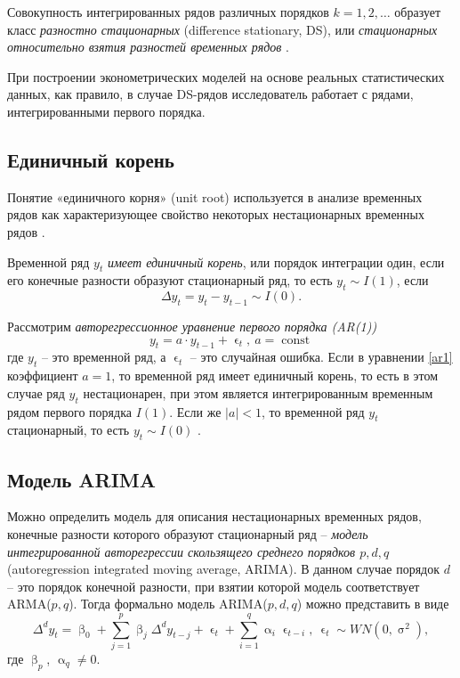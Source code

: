 \documentclass[a4paper, 14pt]{extreport}
\numberwithin{equation}{section}
\renewcommand{\alpha}{\upalpha}
\renewcommand{\beta}{\upbeta}
\renewcommand{\epsilon}{\upvarepsilon}
\renewcommand{\sigma}{\upsigma}
\newcommand{\const}{\operatorname{const}}
\numberwithin{equation}{section}
\begin{document}
	Совокупность интегрированных рядов различных порядков
	$k=1,2,\ldots$  образует класс \textit{разностно стационарных} (difference stationary, DS), или \textit{стационарных относительно взятия  разностей временных рядов} \cite{10}.
	
	При построении эконометрических моделей на основе реальных
	статистических данных, как правило, в случае DS-рядов исследователь работает с
	рядами, интегрированными первого порядка.
	
	\subsection{Единичный корень}
	
	Понятие «единичного корня» (unit root) используется в анализе временных
	рядов как характеризующее свойство некоторых нестационарных временных рядов \cite{11}. 
	
	Временной ряд $y_t$ \textit{имеет единичный корень}, или порядок интеграции один, если его конечные разности образуют стационарный ряд, то есть $y_t \sim I(1)$, если $$\Delta y_t = y_t - y_{t-1} \sim I(0).$$
	
	Рассмотрим \textit{авторегрессионное уравнение первого порядка (AR(1))}
	\begin{equation}
		y_t = a\cdot y_{t-1} + \epsilon_t,\ a = \const
		\label{ar1}
	\end{equation}
	где $y_t$ -- это временной ряд, а $\epsilon_t$ -- это случайная ошибка. Если в уравнении \eqref{ar1} коэффициент $a=1$, то временной ряд имеет единичный корень, то есть в этом случае ряд $y_t$ нестационарен, при этом является интегрированным временным рядом первого порядка $I(1)$. Если же $|a| < 1$, то временной ряд $y_t$ стационарный, то есть $y_t\sim I(0)$ \cite{12}.
	
	\subsection{Модель ARIMA}
	
	Можно определить модель для описания нестационарных временных рядов, конечные разности которого образуют стационарный ряд -- \textit{модель интегрированной авторегрессии скользящего среднего порядков $p,d,q$}\\ (autoregression integrated moving average, ARIMA).
	В данном случае порядок $d$ -- это порядок конечной разности, при взятии которой модель соответствует ARMA($p,q$). Тогда формально модель ARIMA($p,d,q$) можно представить в виде
	\begin{equation}\label{eq:arima}
		\Delta ^d y_t = \beta_0 + \sum_{j=1}^{p} \beta_j\Delta ^d y_{t-j} + \epsilon_t + \sum_{i=1}^q \alpha_i \epsilon_{t-i},\ \epsilon_t\sim WN(0,\sigma^2),
	\end{equation}
	где $\beta_p$, $\alpha_q \ne 0$. 
	
\end{document}
